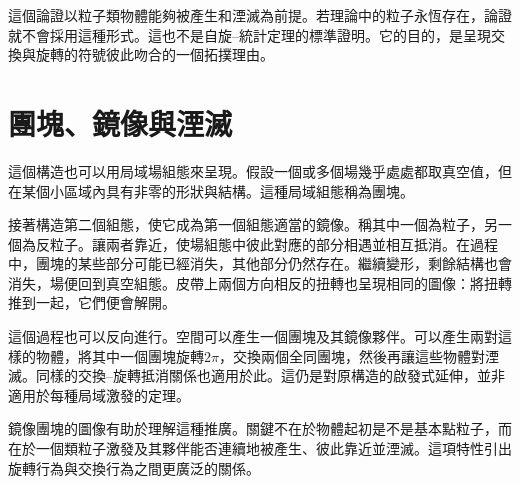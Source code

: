 \begin{classroomqa}
\end{classroomqa}

這個論證以粒子類物體能夠被產生和湮滅為前提。若理論中的粒子永恆存在，論證就不會採用這種形式。這也不是自旋--統計定理的標準證明。它的目的，是呈現交換與旋轉的符號彼此吻合的一個拓撲理由。

\section{團塊、鏡像與湮滅}

這個構造也可以用局域場組態來呈現。假設一個或多個場幾乎處處都取真空值，但在某個小區域內具有非零的形狀與結構。這種局域組態稱為團塊。

接著構造第二個組態，使它成為第一個組態適當的鏡像。稱其中一個為粒子，另一個為反粒子。讓兩者靠近，使場組態中彼此對應的部分相遇並相互抵消。在過程中，團塊的某些部分可能已經消失，其他部分仍然存在。繼續變形，剩餘結構也會消失，場便回到真空組態。皮帶上兩個方向相反的扭轉也呈現相同的圖像：將扭轉推到一起，它們便會解開。

這個過程也可以反向進行。空間可以產生一個團塊及其鏡像夥伴。可以產生兩對這樣的物體，將其中一個團塊旋轉\(2\pi\)，交換兩個全同團塊，然後再讓這些物體對湮滅。同樣的交換--旋轉抵消關係也適用於此。這仍是對原構造的啟發式延伸，並非適用於每種局域激發的定理。

\begin{classroomqa}
\end{classroomqa}

鏡像團塊的圖像有助於理解這種推廣。關鍵不在於物體起初是不是基本點粒子，而在於一個類粒子激發及其夥伴能否連續地被產生、彼此靠近並湮滅。這項特性引出旋轉行為與交換行為之間更廣泛的關係。

\begin{classroomqa}
\end{classroomqa}


